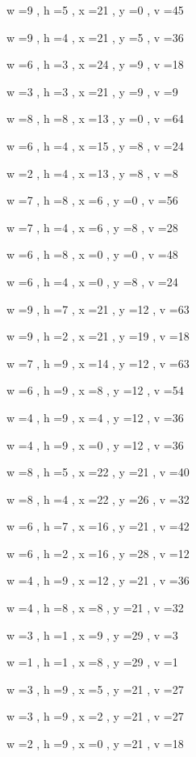 \documentclass[11pt]{article}
\begin{document}
w =9 , h =5 , x =21 , y =0 , v =45
\par
w =9 , h =4 , x =21 , y =5 , v =36
\par
w =6 , h =3 , x =24 , y =9 , v =18
\par
w =3 , h =3 , x =21 , y =9 , v =9
\par
w =8 , h =8 , x =13 , y =0 , v =64
\par
w =6 , h =4 , x =15 , y =8 , v =24
\par
w =2 , h =4 , x =13 , y =8 , v =8
\par
w =7 , h =8 , x =6 , y =0 , v =56
\par
w =7 , h =4 , x =6 , y =8 , v =28
\par
w =6 , h =8 , x =0 , y =0 , v =48
\par
w =6 , h =4 , x =0 , y =8 , v =24
\par
w =9 , h =7 , x =21 , y =12 , v =63
\par
w =9 , h =2 , x =21 , y =19 , v =18
\par
w =7 , h =9 , x =14 , y =12 , v =63
\par
w =6 , h =9 , x =8 , y =12 , v =54
\par
w =4 , h =9 , x =4 , y =12 , v =36
\par
w =4 , h =9 , x =0 , y =12 , v =36
\par
w =8 , h =5 , x =22 , y =21 , v =40
\par
w =8 , h =4 , x =22 , y =26 , v =32
\par
w =6 , h =7 , x =16 , y =21 , v =42
\par
w =6 , h =2 , x =16 , y =28 , v =12
\par
w =4 , h =9 , x =12 , y =21 , v =36
\par
w =4 , h =8 , x =8 , y =21 , v =32
\par
w =3 , h =1 , x =9 , y =29 , v =3
\par
w =1 , h =1 , x =8 , y =29 , v =1
\par
w =3 , h =9 , x =5 , y =21 , v =27
\par
w =3 , h =9 , x =2 , y =21 , v =27
\par
w =2 , h =9 , x =0 , y =21 , v =18
\par
\newpage
\end{document}
